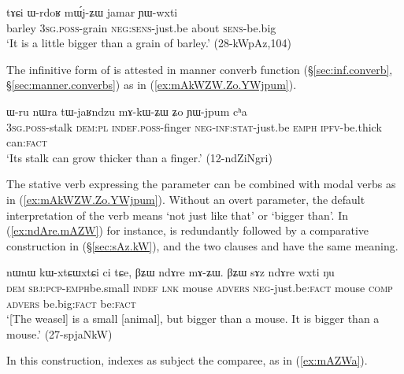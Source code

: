\begin{exe}
\ex \label{ex:mWjZW.jamar}
 \gll tɤɕi ɯ-rdoʁ mɯ́j-ʑɯ jamar ɲɯ-wxti \\
 barley \textsc{3sg}.\textsc{poss}-grain \textsc{neg}:\textsc{sens}-just.be about \textsc{sens}-be.big \\
 \glt `It is a little bigger than a grain of barley.' (28-kWpAz,104)
\end{exe}

The infinitive form  of  is attested in manner converb function (§\ref{sec:inf.converb}, §\ref{sec:manner.converbs}) as in (\ref{ex:mAkWZW.Zo.YWjpum}). 

\begin{exe}
\ex \label{ex:mAkWZW.Zo.YWjpum}
 \gll ɯ-ru nɯra tɯ-jaʁndzu mɤ-kɯ-ʑɯ ʑo ɲɯ-jpum cʰa \\
\textsc{3sg}.\textsc{poss}-stalk \textsc{dem}:\textsc{pl} \textsc{indef}.\textsc{poss}-finger \textsc{neg}-\textsc{inf}:\textsc{stat}-just.be \textsc{emph} \textsc{ipfv}-be.thick can:\textsc{fact} \\
 \glt `Its stalk can grow thicker than a finger.' (12-ndZiNgri)
\end{exe}

The stative verb expressing the parameter can be combined with modal verbs as in (\ref{ex:mAkWZW.Zo.YWjpum}). Without an overt parameter, the default interpretation of the verb  means `not just like that' or `bigger than'. In (\ref{ex:ndAre.mAZW}) for instance,  is redundantly followed by a comparative construction in  (§\ref{sec:sAz.kW}), and the two clauses  and  have the same meaning.

\begin{exe}
\ex \label{ex:ndAre.mAZW}
 \gll nɯnɯ kɯ-xtɕɯ\redp{}xtɕi ci tɕe, βʑɯ ndɤre mɤ-ʑɯ. βʑɯ sɤz ndɤre wxti ŋu \\
 \textsc{dem} \textsc{sbj}:\textsc{pcp}-\textsc{emph}\redp{}be.small \textsc{indef} \textsc{lnk} mouse \textsc{advers} \textsc{neg}-just.be:\textsc{fact} mouse \textsc{comp} \textsc{advers} be.big:\textsc{fact} be:\textsc{fact} \\
\glt `[The weasel] is a small [animal], but bigger than a mouse. It is bigger than a mouse.' (27-spjaNkW)
\end{exe}

In this construction,  indexes as subject the comparee, as in (\ref{ex:mAZWa}).

